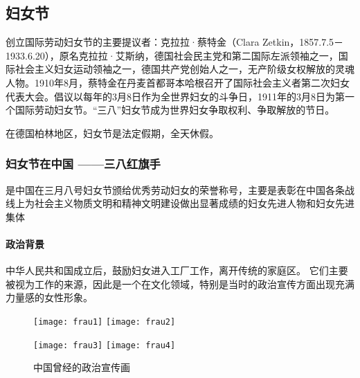 \subsection{妇女节}

创立国际劳动妇女节的主要提议者：克拉拉·蔡特金（Clara Zetkin，1857.7.5－1933.6.20），原名克拉拉·艾斯纳，德国社会民主党和第二国际左派领袖之一，国际社会主义妇女运动领袖之一，德国共产党创始人之一，无产阶级女权解放的灵魂人物。1910年8月，蔡特金在丹麦首都哥本哈根召开了国际社会主义者第二次妇女代表大会。倡议以每年的3月8日作为全世界妇女的斗争日，1911年的3月8日为第一个国际劳动妇女节。“三八”妇女节成为世界妇女争取权利、争取解放的节日。

在德国柏林地区，妇女节是法定假期，全天休假。

\subsubsection{妇女节在中国 ——三八红旗手}
是中国在三月八号妇女节颁给优秀劳动妇女的荣誉称号，主要是表彰在中国各条战线上为社会主义物质文明和精神文明建设做出显著成绩的妇女先进人物和妇女先进集体

\paragraph{政治背景}
中华人民共和国成立后，鼓励妇女进入工厂工作，离开传统的家庭区。 它们主要被视为工作的来源，因此是一个在文化领域，特别是当时的政治宣传方面出现充满力量感的女性形象。
\begin{figure}[htb]
    \centering
    \texttt{[image: frau1]}
    \texttt{[image: frau2]}
    
    \texttt{[image: frau3]}
    \texttt{[image: frau4]}
    \caption{中国曾经的政治宣传画}
\end{figure}